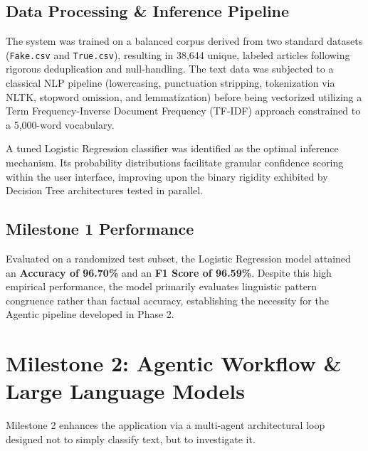 \documentclass[12pt, a4paper]{article}
\begin{document}
\subsection{Data Processing \& Inference Pipeline}
The system was trained on a balanced corpus derived from two standard datasets (\texttt{Fake.csv} and \texttt{True.csv}), resulting in 38,644 unique, labeled articles following rigorous deduplication and null-handling. The text data was subjected to a classical NLP pipeline (lowercasing, punctuation stripping, tokenization via NLTK, stopword omission, and lemmatization) before being vectorized utilizing a Term Frequency-Inverse Document Frequency (TF-IDF) approach constrained to a 5,000-word vocabulary.

A tuned Logistic Regression classifier was identified as the optimal inference mechanism. Its probability distributions facilitate granular confidence scoring within the user interface, improving upon the binary rigidity exhibited by Decision Tree architectures tested in parallel.

\subsection{Milestone 1 Performance}
Evaluated on a randomized test subset, the Logistic Regression model attained an \textbf{Accuracy of 96.70\%} and an \textbf{F1 Score of 96.59\%}. Despite this high empirical performance, the model primarily evaluates linguistic pattern congruence rather than factual accuracy, establishing the necessity for the Agentic pipeline developed in Phase 2.

\section{Milestone 2: Agentic Workflow \& Large Language Models}

Milestone 2 enhances the application via a multi-agent architectural loop designed not to simply classify text, but to investigate it. 
\end{document}
